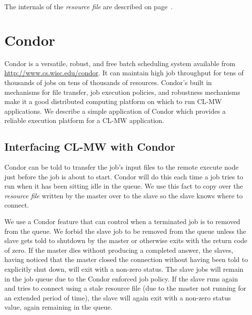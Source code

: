 \documentclass[titlepage,12pt]{book}
\newcommand{\xsmall}{\latexhtml{\small}{}}
\newcommand{\xnormalsize}{\latexhtml{\normalsize}{}}
\newcommand{\clmw}{\xsmall\textsc{CL-MW}\xnormalsize\xspace}
\newcommand{\rfile}{\textit{resource file}\xspace}
\begin{document}
The internals of the \rfile are described on
page~\pageref{resource-file}.

\section{Condor}

Condor is a versatile, robust, and free batch scheduling system
available from \url{http://www.cs.wisc.edu/condor}. It can maintain
high job throughput for tens of thousands of jobs on tens of thousands
of resources. Condor's built in mechanisms for file transfer,
job execution policies, and robustness mechanisms make it a good
distributed computing platform on which to run \clmw applications.
We describe a simple application of Condor which provides a reliable
execution platform for a \clmw application.

\subsection{Interfacing \clmw with Condor}

Condor can be told to transfer the job's input files to the remote
execute node just before the job is about to start. Condor will do
this each time a job tries to run when it has been sitting idle in
the queue. We use this fact to copy over the \rfile written by the
master over to the slave so the slave knows where to connect.

We use a Condor feature that can control when a terminated job is
to removed from the queue. We forbid the slave job to be removed
from the queue unless the slave gets told to shutdown by the master
or otherwise exits with the return code of zero.  If the master dies
without producing a completed answer, the slaves, having noticed that
the master closed the connection without having been told to explicitly
shut down, will exit with a non-zero status. The slave jobs will remain
in the job queue due to the Condor enforced job policy. If the slave
runs again and tries to connect using a stale resource file (due to
the master not running for an extended period of time), the slave will
again exit with a non-zero status value, again remaining in the queue.
\end{document}
